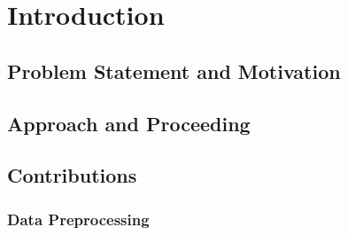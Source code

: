 \chapter{Introduction}
\label{ch:introduction}

\section{Problem Statement and Motivation} 
\label{ch:intro-problemStatement}







\section{Approach and Proceeding}
\label{ch:intro-approach}




\section{Contributions}
\label{ch:intro-contributions}

\subsection{Data Preprocessing}
\label{ch:intro-contributions-dataPreprocessing}


